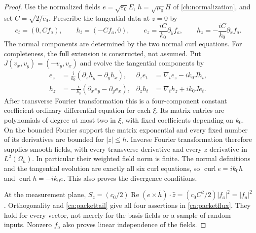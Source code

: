 \begin{proof}
Use the normalized fields $e=\sqrt{\varepsilon_0}E$,
$h=\sqrt{\mu_0}H$ of \eqref{ch:normalization}, and set
$C=\sqrt{2/c_0}$.  Prescribe the tangential data at $z=0$ by
\begin{equation}
 e_t=(0,Cf_a),\qquad h_t=(-Cf_a,0),\qquad
 e_z=\frac{iC}{k_0}\partial_yf_a,\qquad
 h_z=-\frac{iC}{k_0}\partial_xf_a.
 \label{ca:cauchydata}
\end{equation}
The normal components are determined by the two normal curl equations.
For completeness, the full extension is constructed, not assumed.  Put
$J(v_x,v_y)=(-v_y,v_x)$ and evolve the tangential components by
\begin{equation}
 \begin{aligned}
 e_z&=\frac{i}{k_0}(\partial_xh_y-\partial_yh_x),&
 \partial_z e_t&=\nabla_te_z-ik_0J h_t,\\
 h_z&=-\frac{i}{k_0}(\partial_xe_y-\partial_ye_x),&
 \partial_z h_t&=\nabla_th_z+ik_0J e_t.
 \end{aligned}
 \label{ca:cauchyevolution}
\end{equation}
After transverse Fourier transformation this is a four-component constant
coefficient ordinary differential equation for each $\xi$.  Its matrix
entries are polynomials of degree at most two in $\xi$, with fixed
coefficients depending on $k_0$.  On the bounded Fourier support the
matrix exponential and every fixed number of its derivatives are bounded
for $|z|\leq h$.  Inverse Fourier transformation therefore supplies smooth
fields, with every transverse derivative and every $z$ derivative in
$L^2(\Omega_h)$.  In particular their weighted field norm is finite.
The normal definitions and the tangential evolution are exactly all six
curl equations, so
$\operatorname{curl}e=ik_0h$ and
$\operatorname{curl}h=-ik_0e$.  This also proves the divergence conditions.

At the measurement plane,
$S_z=(c_0/2)\operatorname{Re}(e\times\overline h)\cdot\hat z
=(c_0C^2/2)|f_a|^2=|f_a|^2$.
Orthogonality and \eqref{ca:packettail} give all four assertions in
\eqref{ca:packetflux}.  They hold for every vector, not merely for the
basis fields or a sample of random inputs.  Nonzero $f_a$ also proves
linear independence of the fields.
\end{proof}

